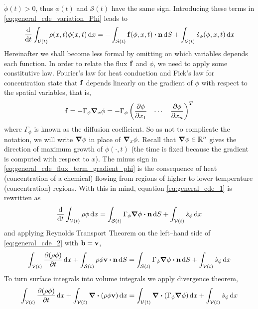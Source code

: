 $\dot{\phi}(t) > 0$, thus $\dot{\phi}(t)$ and $\mathscr{S}(t)$ have the same
sign. Introducing these terms in \eqref{eq:general_cde_variation_Phi} leads to
\begin{equation} \label{eq:general_cde_1}
	\frac{\dd}{\dd{t}} \int_{\cvt} \rho(x, t) \phi(x, t) \dd{x} = 
	- \int_{\cst} \vb{f}(\phi, x, t) \vdot \vb{n} \dd{S} 
	+ \int_{\cvt} \dot{s}_\phi (\phi, x, t) \dd{x}	
\end{equation}
Hereinafter we shall become less formal by omitting on which variables depends
each function. In order to relate the flux $\vb{f}$ and $\phi$, we need to apply
some constitutive law. Fourier's law for heat conduction and Fick's law for
concentration state that $\vb{f}$ depends linearly on the gradient of $\phi$
with respect to the spatial variables, that is,
\begin{equation} \label{eq:general_cde_flux_term_gradient_phi}
	\vb{f} = 
	-\Gamma_\phi \grad_{x} \phi = 
	-\Gamma_\phi
	\begin{pmatrix}
		\displaystyle\pdv{\phi}{x_1} & \cdots & \displaystyle\pdv{\phi}{x_n}
	\end{pmatrix}^T
\end{equation}
where $\Gamma_\phi$ is known as the diffusion coefficient. So as not to
complicate the notation, we will write $\grad{\phi}$ in place of $\grad_{x}
\phi$. Recall that $\grad{\phi} \in \mathbb{R}^n$ gives the direction of maximum
growth of $\phi(\cdot, t)$ (the time is fixed because the gradient is computed
with respect to $x$). The minus sign in
\eqref{eq:general_cde_flux_term_gradient_phi} is the consequence of heat
(concentration of a chemical) flowing from regions of higher to lower
temperature (concentration) regions. With this in mind, equation
\eqref{eq:general_cde_1} is rewritten as
\begin{equation} \label{eq:general_cde_2}
	\frac{\dd}{\dd{t}} \int_{\cvt} \rho \phi \dd{x} = 
	\int_{\cst} \Gamma_\phi \grad{\phi} \vdot \vb{n} \dd{S} +
	\int_{\cvt} \dot{s}_\phi \dd{x}	
\end{equation}
and applying Reynolds Transport Theorem on the left--hand side of
\eqref{eq:general_cde_2} with $\vb{b} = \vb{v}$,
\begin{equation*}
	\int_{\cvt} \pdv{(\rho \phi)}{t} \dd{x} + 
	\int_{\cst} \rho \phi \vb{v} \vdot \vb{n} \dd{S} = 
	\int_{\cst} \Gamma_\phi \grad{\phi} \vdot \vb{n} \dd{S} +
	\int_{\cvt} \dot{s}_\phi \dd{x}	
\end{equation*}
To turn surface integrals into volume integrals we apply divergence theorem,
\begin{equation*}
	\int_{{\mathcal{V}(t)}} \pdv{(\rho \phi)}{t} \dd{x} + 
	\int_{{\mathcal{V}(t)}} \div(\rho \phi \vb{v}) \dd{x} = 
	\int_{{\mathcal{V}(t)}} \div(\Gamma_\phi \grad{\phi}) \dd{x} + 
	\int_{{\mathcal{V}(t)}} \dot{s}_\phi \dd{x}	
\end{equation*}
